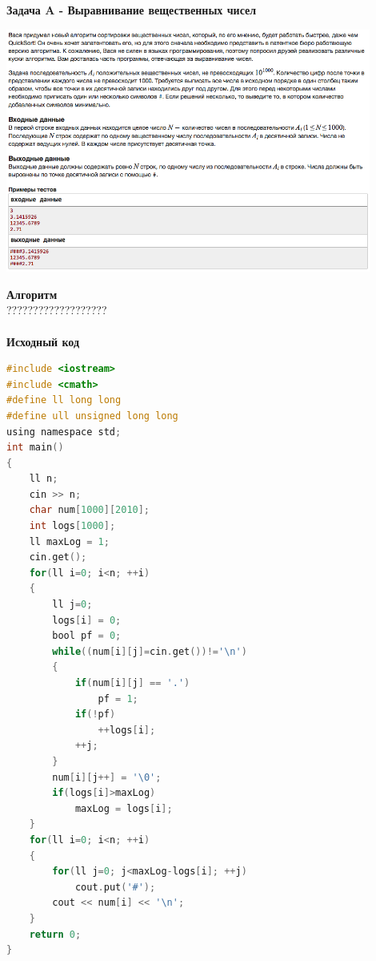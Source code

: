 \documentclass[a4paper,12pt]{article}
\begin{document}
\textbf{{\large Задача A - Выравнивание вещественных чисел}} \\
\begin{center}
\includegraphics[width=0.9\textwidth]{CT_school_nn/CT_school_nn_A.png}\\ [1cm]
\end{center}
\textbf{{\large Алгоритм}} \\
{\Huge ???????????????????} \\ 
\\
\textbf{{\large Исходный код}}
\begin{lstlisting}[language=C]
#include <iostream>
#include <cmath>
#define ll long long
#define ull unsigned long long
using namespace std;
int main()
{
    ll n;
    cin >> n;
    char num[1000][2010];
    int logs[1000];
    ll maxLog = 1;
    cin.get();
    for(ll i=0; i<n; ++i)
    {
        ll j=0;
        logs[i] = 0;
        bool pf = 0;
        while((num[i][j]=cin.get())!='\n')
        {
            if(num[i][j] == '.')
                pf = 1;
            if(!pf)
                ++logs[i];
            ++j;
        }
        num[i][j++] = '\0';
        if(logs[i]>maxLog)
            maxLog = logs[i];
    }
    for(ll i=0; i<n; ++i)
    {
        for(ll j=0; j<maxLog-logs[i]; ++j)
            cout.put('#');
        cout << num[i] << '\n';
    }
    return 0;
}
\end{lstlisting}
\end{document}
